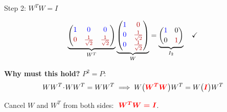 \documentclass[10pt]{beamer}
\theoremstyle{definition}
\newcommand{\x}[1]{\alert{\textbf{#1}}}
\newcommand{\bl}[1]{{\color{blue}#1}}                 %
\newcommand{\rd}[1]{{\color{red!70!black}#1}}         %
\begin{document}
\begin{frame}{Step 2: $W^TW = I$}

$$\underbrace{\begin{pmatrix}
\bl{1} & \bl{0} & \bl{0} \\[2pt]
\rd{0} & \rd{\frac{1}{\sqrt{2}}} & \rd{\frac{1}{\sqrt{2}}}
\end{pmatrix}}_{W^T}
\underbrace{\begin{pmatrix}
\bl{1} & \rd{0} \\[2pt]
\bl{0} & \rd{\frac{1}{\sqrt{2}}} \\[2pt]
\bl{0} & \rd{\frac{1}{\sqrt{2}}}
\end{pmatrix}}_{W}
=
\underbrace{\begin{pmatrix}
\bl{1} & 0 \\[2pt]
0 & \rd{1}
\end{pmatrix}}_{I_2} \quad\checkmark$$

\vspace{0.5em}

\x{Why must this hold?} \quad $P^2 = P$:
$$WW^T \!\cdot\! WW^T = WW^T \;\Longrightarrow\; W\bigl({\color{red}\boldsymbol{W^TW}}\bigr)W^T = W\bigl({\color{red}\boldsymbol{I}}\bigr)W^T$$

Cancel $W$ and $W^T$ from both sides: $\;{\color{red}\boldsymbol{W^TW = I}}$.

\end{frame}
\end{document}
